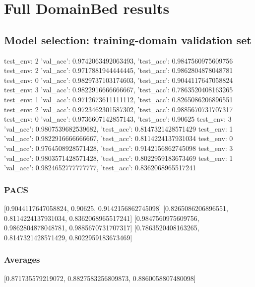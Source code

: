 \documentclass{article}
\begin{document}
\section{Full DomainBed results}

\subsection{Model selection: training-domain validation set}
test_env: 2
{'val_acc': 0.9742063492063493, 'test_acc': 0.9847560975609756}
test_env: 2
{'val_acc': 0.9717881944444445, 'test_acc': 0.9862804878048781}
test_env: 0
{'val_acc': 0.9829737103174603, 'test_acc': 0.9044117647058824}
test_env: 3
{'val_acc': 0.9822916666666667, 'test_acc': 0.7863520408163265}
test_env: 1
{'val_acc': 0.9712673611111112, 'test_acc': 0.8265086206896551}
test_env: 2
{'val_acc': 0.9723462301587302, 'test_acc': 0.9885670731707317}
test_env: 0
{'val_acc': 0.9736607142857143, 'test_acc': 0.90625}
test_env: 3
{'val_acc': 0.9807539682539682, 'test_acc': 0.8147321428571429}
test_env: 1
{'val_acc': 0.9822916666666667, 'test_acc': 0.8114224137931034}
test_env: 0
{'val_acc': 0.9764508928571428, 'test_acc': 0.9142156862745098}
test_env: 3
{'val_acc': 0.9803571428571428, 'test_acc': 0.8022959183673469}
test_env: 1
{'val_acc': 0.9824652777777777, 'test_acc': 0.8362068965517241}

\subsubsection{PACS}
[0.9044117647058824, 0.90625, 0.9142156862745098]
[0.8265086206896551, 0.8114224137931034, 0.8362068965517241]
[0.9847560975609756, 0.9862804878048781, 0.9885670731707317]
[0.7863520408163265, 0.8147321428571429, 0.8022959183673469]

\begin{center}
\end{center}

\subsubsection{Averages}
[0.871735579219072, 0.8827583256809873, 0.8860058807480098]

\begin{center}
\end{center}
\end{document}
